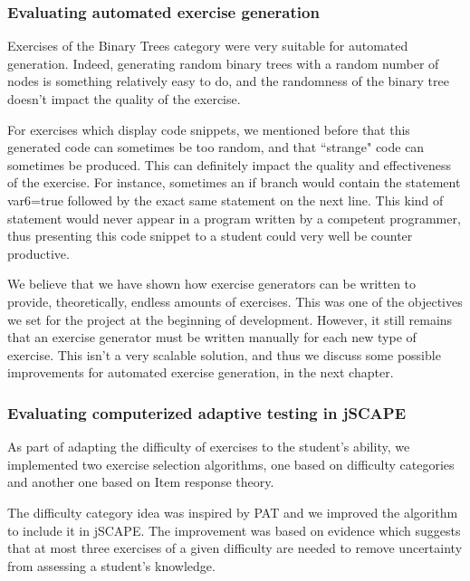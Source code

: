 \subsubsection{Evaluating automated exercise generation}
Exercises of the Binary Trees category were very suitable for automated generation. Indeed, generating random binary trees with a random number of nodes is something relatively easy to do, and the randomness of the binary tree doesn't impact the quality of the exercise.\newline

For exercises which display code snippets, we mentioned before that this generated code can sometimes be too random, and that ``strange" code can sometimes be produced. This can definitely impact the quality and effectiveness of the exercise. For instance, sometimes an \textsf{if} branch would contain the statement \textsf{var6=true} followed by the exact same statement on the next line. This kind of statement would never appear in a program written by a competent programmer, thus presenting this code snippet to a student could very well be counter productive. \newline

We believe that we have shown how exercise generators can be written to provide, theoretically, endless amounts of exercises. This was one of the objectives we set for the project at the beginning of development. However, it still remains that an exercise generator must be written manually for each new type of exercise. This isn't a very scalable solution, and thus we discuss some possible improvements for automated exercise generation, in the next chapter.

\subsubsection{Evaluating computerized adaptive testing in jSCAPE}
As part of adapting the difficulty of exercises to the student's ability, we implemented two exercise selection algorithms, one based on difficulty categories and another one based on Item response theory.\newline

The difficulty category idea was inspired by PAT\cite{PAT} and we improved the algorithm to include it in jSCAPE. The improvement was based on evidence\cite{Abdullah} which suggests that at most three exercises of a given difficulty are needed to remove uncertainty from assessing a student's knowledge.\newline

